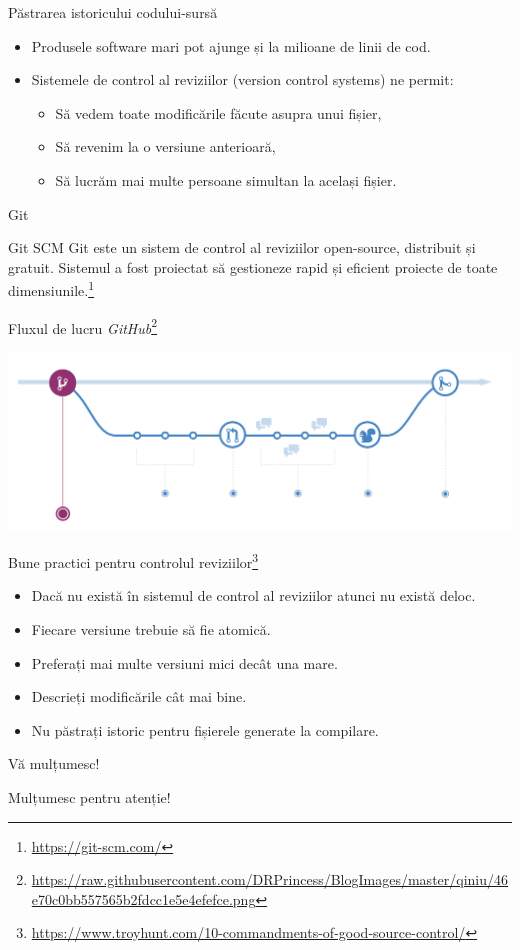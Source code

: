 \documentclass[presentation]{beamer}
\begin{document}
\begin{frame}[label={sec:org2395a16}]{Păstrarea istoricului codului-sursă}
\begin{itemize}
\item Produsele software mari pot ajunge și la milioane de linii de cod.
\item Sistemele de control al reviziilor (version control systems) ne permit:
\begin{itemize}
\item Să vedem toate modificările făcute asupra unui fișier,
\item Să revenim la o versiune anterioară,
\item Să lucrăm mai multe persoane simultan la același fișier.
\end{itemize}
\end{itemize}
\end{frame}
\begin{frame}[label={sec:orge3f25b8}]{Git}
\begin{block}{Git SCM}
Git este un sistem de control al reviziilor open-source, distribuit și gratuit. Sistemul a fost proiectat să gestioneze rapid și eficient proiecte de toate dimensiunile.\footnote{\url{https://git-scm.com/}}
\end{block}
\end{frame}
\begin{frame}[label={sec:org8bbc929}]{Fluxul de lucru \emph{GitHub}\footnote{\url{https://raw.githubusercontent.com/DRPrincess/BlogImages/master/qiniu/46e70c0bb557565b2fdcc1e5e4efefce.png}}}
\begin{center}
\includegraphics[width=\textwidth]{img/github-flow.png}
\end{center}
\end{frame}
\begin{frame}[label={sec:orgd98a483}]{Bune practici pentru controlul reviziilor\footnote{\url{https://www.troyhunt.com/10-commandments-of-good-source-control/}}}
\begin{itemize}
\item Dacă nu există în sistemul de control al reviziilor atunci nu există deloc.
\item Fiecare versiune trebuie să fie atomică.
\item Preferați mai multe versiuni mici decât una mare.
\item Descrieți modificările cât mai bine.
\item Nu păstrați istoric pentru fișierele generate la compilare.
\end{itemize}
\end{frame}
\begin{frame}[label={sec:orgc545c7a}]{Vă mulțumesc!}
\begin{center}
Mulțumesc pentru atenție!
\end{center}
\end{frame}
\end{document}
